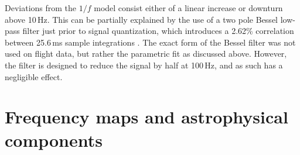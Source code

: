 \documentclass[twocolumn]{../../common/aa}
\begin{document}
Deviations from the $1/f$ model consist either of a linear increase or downturn
above 10\,Hz. This can be partially explained by the use of a two pole Bessel
low-pass filter just prior to signal quantization, which introduces a 2.62\%
correlation between 25.6\,ms sample integrations
\citep[][Sect.~5.3]{jarosik2003:MAP}. The exact form of the Bessel filter was
not used on flight data, but rather the parametric fit as discussed above.
However, the filter is designed to reduce the signal by half at 100\,Hz, and as
such has a negligible effect. 





\lipsum[1-4]



\section{Frequency maps and astrophysical components}
\label{sec:maps}
\end{document}
